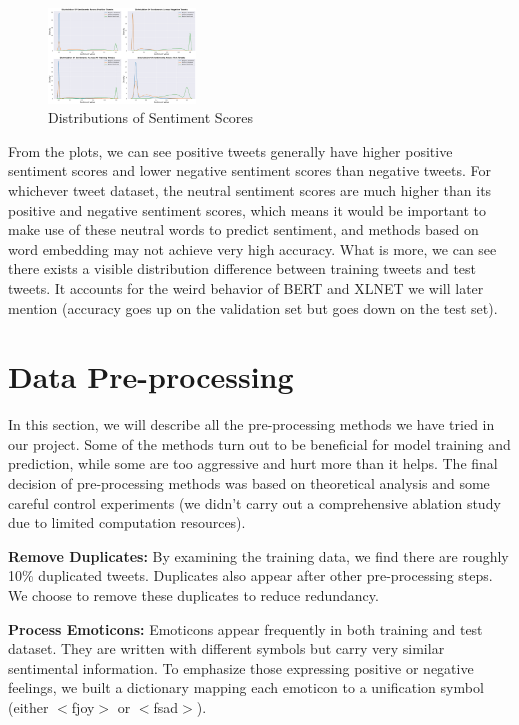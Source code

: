 \documentclass[journal]{IEEEtran}
\begin{document}
\begin{figure}[h]
    \centering
        \includegraphics[width=0.35\textwidth]{distributions.png}
    \caption{\label{fig:distributions}Distributions of Sentiment Scores}
\end{figure}

From the plots, we can see positive tweets generally have higher positive sentiment scores and lower negative sentiment scores than negative tweets. For whichever tweet dataset, the neutral sentiment scores are much higher than its positive and negative sentiment scores, which means it would be important to make use of these neutral words to predict sentiment, and methods based on word embedding may not achieve very high accuracy. What is more, we can see there exists a visible distribution difference between training tweets and test tweets. It accounts for the weird behavior of BERT and XLNET we will later mention (accuracy goes up on the validation set but goes down on the test set).

\section{Data Pre-processing}
In this section, we will describe all the pre-processing methods we have tried in our project. Some of the methods turn out to be beneficial for model training and prediction, while some are too aggressive and hurt more than it helps. The final decision of pre-processing methods was based on theoretical analysis and some careful control experiments (we didn't carry out a comprehensive ablation study due to limited computation resources).

\textbf{Remove Duplicates:} By examining the training data, we find there are roughly 10\% duplicated tweets. Duplicates also appear after other pre-processing steps. We choose to remove these duplicates to reduce redundancy.

\textbf{Process Emoticons:} Emoticons appear frequently in both training and test dataset. They are written with different symbols but carry very similar sentimental information. To emphasize those expressing positive or negative feelings, we built a dictionary mapping each emoticon to a unification symbol (either $<$fjoy$>$ or $<$fsad$>$).
\end{document}
